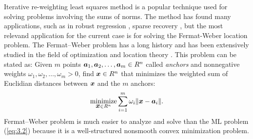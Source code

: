 
Iterative re-weighting least squares method is a popular technique used for solving problems involving the sums of norms. The method has found many applications, such as in robust regression \cite{RReg, GIRLS}, sparse recovery \cite{Daub}, but the most relevand application for the current case is for solving the Fermat-Weber location problem. The Fermat--Weber problem %
has a long history and has been extensively studied in the field of optimization and location theory \cite{GIRLS}. This problem can be stated as: Given $m$ points $\mbox{\boldmath$a$}_1, \mbox{\boldmath$a$}_2, \ldots, \mbox{\boldmath$a$}_m \in R^n$ called \textit{anchors} and nonnegative weights $\omega_1, \omega_2, \ldots, \omega_m > 0$, find $\mbox{\boldmath$x$} \in R^n$ that minimizes the weighted sum of Euclidian distances between $\mbox{\boldmath$x$}$ and the $m$ anchors:
\begin{equation} \label{eq:FW}
\nonumber
\mathop{\mbox{minimize}}_{\mbox{\boldmath$x$} \in R^n} \sum_{i=1}^{m} \omega_i\|\mbox{\boldmath$x$} - \mbox{\boldmath$a$}_i\|.
\end{equation}
Fermat--Weber problem is much easier to analyze and solve than the ML problem (\ref{eq:3.2}) because it is a well-structured nonsmooth convex minimization problem. 
